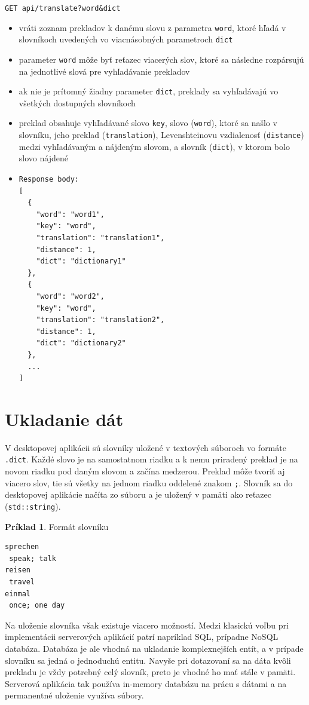 \documentclass[
  digital, %
  table,   %
  lof,     %
  lot,     %
]{fithesis3}
\begin{document}
\noindent
\texttt{GET api/translate?word\&dict}
\begin{itemize}
\item vráti zoznam prekladov k danému slovu z parametra \texttt{word}, ktoré hľadá v slovníkoch uvedených vo viacnásobných parametroch \texttt{dict}
\item parameter \texttt{word} môže byť reťazec viacerých slov, ktoré sa následne rozpársujú na jednotlivé slová pre vyhľadávanie prekladov
\item ak nie je prítomný žiadny parameter \texttt{dict}, preklady sa vyhľadávajú vo všetkých dostupných slovníkoch
\item preklad obsahuje vyhľadávané slovo \texttt{key}, slovo (\texttt{word}), ktoré sa našlo v slovníku, jeho preklad (\texttt{translation}), Levenshteinovu vzdialenosť (\texttt{distance}) medzi vyhľadávaným a nájdeným slovom, a slovník (\texttt{dict}), v ktorom bolo slovo nájdené
\item \begin{lstlisting}[basicstyle=\small]
Response body:
[
  {
    "word": "word1",
    "key": "word",
    "translation": "translation1",
    "distance": 1,
    "dict": "dictionary1"
  },
  {
    "word": "word2",
    "key": "word",
    "translation": "translation2",
    "distance": 1,
    "dict": "dictionary2"
  },
  ...
]
\end{lstlisting}
\end{itemize}


\section{Ukladanie dát}
V desktopovej aplikácii sú slovníky uložené v textových súboroch vo formáte \texttt{.dict}. Každé slovo je na samostatnom riadku a k nemu priradený preklad je na novom riadku pod daným slovom a začína medzerou. Preklad môže tvoriť aj viacero slov, tie sú všetky na jednom riadku oddelené znakom \texttt{;}. Slovník sa do desktopovej aplikácie načíta zo súboru a je uložený v pamäti ako reťazec (\texttt{std::string}).

\theoremstyle{definition}
\newtheorem{exmp}{Príklad}[chapter]
\begin{exmp}
Formát slovníku
\centering
\begin{lstlisting}[basicstyle=\small]
sprechen
 speak; talk
reisen
 travel
einmal
 once; one day
\end{lstlisting}
\end{exmp}

Na uloženie slovníka však existuje viacero možností. Medzi klasickú voľbu pri implementácii serverových aplikácií patrí napríklad SQL, prípadne NoSQL databáza. Databáza je ale vhodná na ukladanie komplexnejších entít, a v prípade slovníku sa jedná o jednoduchú entitu. Navyše pri dotazovaní sa na dáta kvôli prekladu je vždy potrebný celý slovník, preto je vhodné ho mať stále v pamäti. Serverová aplikácia tak používa in-memory databázu na prácu s dátami a na permanentné uloženie využíva súbory.
\end{document}
